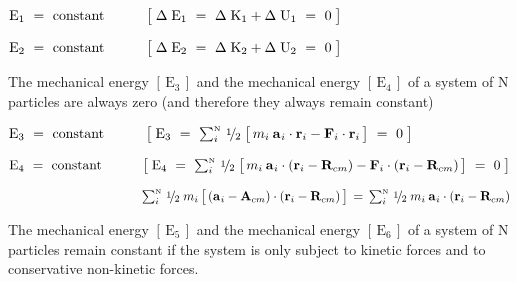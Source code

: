 \documentclass[10pt]{article}
\newcommand{\med}{\raise.5ex\hbox{$\scriptstyle 1$}\kern-.15em/\kern-.09em\lower.25ex\hbox{$\scriptstyle 2$}}
\begin{document}
\par \bigskip\medskip ${\mathrm{E}}_1 ~=~ {\mathrm{constant}} \hspace{+3.00em} \big [ \; \Delta \; {\mathrm{E}}_1 ~=~ \Delta \; {\mathrm{K}}_1 + \Delta \; {\mathrm{U}}_1 ~=~ 0 \; \big ]$

\par \bigskip ${\mathrm{E}}_2 ~=~ {\mathrm{constant}} \hspace{+3.00em} \big [ \; \Delta \; {\mathrm{E}}_2 ~=~ \Delta \; {\mathrm{K}}_2 + \Delta \; {\mathrm{U}}_2 ~=~ 0 \; \big ]$

\par \bigskip\medskip \noindent The mechanical energy $[ \, {\mathrm{E}}_3 \, ]$ and the mechanical energy $[ \, {\mathrm{E}}_4 \, ]$ of a system of N particles are always zero (\hspace{+0.180em}and therefore they always remain constant\hspace{+0.180em})

\par \bigskip\medskip ${\mathrm{E}}_3 ~=~ {\mathrm{constant}} \hspace{+3.00em} \big [ \; {\mathrm{E}}_3 ~=~ \sum_i^{\scriptscriptstyle{\mathrm{N}}} \, \med \; \big [ \, m_i \: {\mathbf{a}}_{\hspace{+0.045em}i} \cdot {\mathbf{r}}_{i} - {\mathbf{F}}_i \cdot {\mathbf{r}}_{i} \, \big ] ~=~ 0 \; \big ]$

\par \bigskip ${\mathrm{E}}_4 ~=~ {\mathrm{constant}} \hspace{+3.00em} \big [ \; {\mathrm{E}}_4 ~=~ \sum_i^{\scriptscriptstyle{\mathrm{N}}} \, \med \; \big [ \, m_i \: {\mathbf{a}}_{\hspace{+0.045em}i} \cdot ({\mathbf{r}}_{i} - {\mathbf{R}}_{cm}) - {\mathbf{F}}_i \cdot ({\mathbf{r}}_{i} - {\mathbf{R}}_{cm}) \, \big ] ~=~ 0 \; \big ]$

\par \bigskip $\hspace{+10.44em} \sum_i^{\scriptscriptstyle{\mathrm{N}}} \, \med \; m_i \, \big [ \, ({\mathbf{a}}_{\hspace{+0.045em}i} - {\mathbf{A}}_{cm}) \cdot ({\mathbf{r}}_{i} - {\mathbf{R}}_{cm}) \, \big ] \,=\, \sum_i^{\scriptscriptstyle{\mathrm{N}}} \, \med \; m_i \: {\mathbf{a}}_{\hspace{+0.045em}i} \cdot ({\mathbf{r}}_{i} - {\mathbf{R}}_{cm})$

\par \bigskip\medskip \noindent The mechanical energy $[ \, {\mathrm{E}}_5 \, ]$ and the mechanical energy $[ \, {\mathrm{E}}_6 \, ]$ of a system of N particles remain constant if the system is only subject to kinetic forces and to conservative non-kinetic forces.
\end{document}
